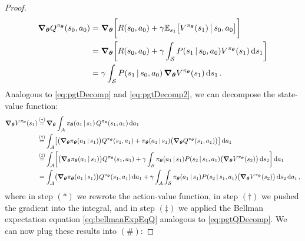 \begin{proof}
			\begin{align}
				\grad_{\bm{\theta}} Q^{\pi_{\bm{\theta}}}(s_0, a_0)
				 & = \grad_{\bm{\theta}} \biggl[ R(s_0, a_0) + \gamma \mathbb{E}_{s_1}\bigl[ V^{\pi_{\bm{\theta}}}(s_1) \,\big\vert\, s_0, a_0 \bigr] \biggr]         \\
				 & = \grad_{\bm{\theta}} \biggl[ R(s_0, a_0) + \gamma \int_\mathcal{S} P(s_1 \,\vert\, s_0, a_0) V^{\pi_{\bm{\theta}}}(s_1) \dd{s_1} \biggr] \\
				 & = \gamma \int_\mathcal{S} P(s_1 \,\vert\, s_0, a_0) \, \grad_{\bm{\theta}} V^{\pi_{\bm{\theta}}}(s_1) \dd{s_1}.
				\label{eq:pgtQDecomp}
			\end{align}
			Analogous to \eqref{eq:pgtDecomp} and \eqref{eq:pgtDecomp2}, we can decompose the state-value function:
			\begin{align}
				\grad_{\vec{\theta}} V^{\pi_{\vec{\theta}}}(s_1)
				 & \overset{\mathclap{(\ast)}}{=} \grad_{\vec{\theta}} \int_\mathcal{A} \pi_{\vec{\theta}}(a_1 \given s_1) \, Q^{\pi_{\vec{\theta}}}(s_1, a_1) \dd{a_1}                                                                                                                                                                                            \\
				 & \overset{\mathclap{(\dagger)}}{=} \int_\mathcal{A} \bigl[ \bigl( \grad_{\vec{\theta}} \pi_{\vec{\theta}}(a_1 \given s_1) \bigr) Q^{\pi_{\vec{\theta}}}(s_1, a_1) + \pi_{\vec{\theta}}(a_1 \given s_1) \bigl( \grad_{\vec{\theta}} Q^{\pi_{\vec{\theta}}}(s_1, a_1) \bigr) \bigr] \dd{a_1}                                                       \\
				 & \overset{\mathclap{(\ddagger)}}{=} \int_\mathcal{A} \biggl[ \bigl( \grad_{\vec{\theta}} \pi_{\vec{\theta}}(a_1 \given s_1) \bigr) Q^{\pi_{\vec{\theta}}}(s_1, a_1) + \gamma \int_\mathcal{S} \pi_{\vec{\theta}}(a_1 \given s_1) P(s_2 \given s_1, a_1) \bigl( \grad_{\vec{\theta}} V^{\pi_{\vec{\theta}}}(s_2) \bigr) \dd{s_2} \biggr] \dd{a_1} \\
				 & = \int_\mathcal{A} \bigl( \grad_{\vec{\theta}} \pi_{\vec{\theta}}(a_1 \given s_1) \bigr) Q^{\pi_{\vec{\theta}}}(s_1, a_1) \dd{a_1} + \gamma \int_\mathcal{A} \int_\mathcal{S} \pi_{\vec{\theta}}(a_1 \given s_1) P(s_2 \given s_1, a_1) \bigl( \grad_{\vec{\theta}} V^{\pi_{\vec{\theta}}}(s_2) \bigr) \dd{s_2} \dd{a_1},
			\end{align}
			where in step \((\ast)\) we rewrote the action-value function, in step \((\dagger)\) we pushed the gradient into the integral, and in step \((\ddagger)\) we applied the Bellman expectation equation \eqref{eq:bellmanExpEqQ} analogous to \eqref{eq:pgtQDecomp}. We can now plug these results into \((\#)\):

\end{proof}
